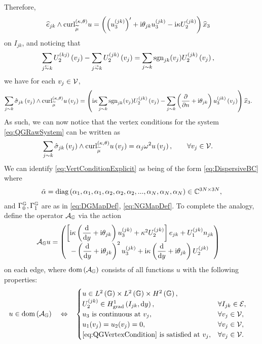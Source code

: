 Therefore, 
\begin{align*}
	\widehat{e}_{jk}\wedge\mathrm{curl}_{\widetilde{\mu}}^{\left( \kappa, \theta \right)}u &= \left(  \left(  u_3^{(jk)}  \right)' + \mathrm{i}\theta_{jk}u_3^{(jk)} - \mathrm{i}\kappa U_2^{(jk)}  \right)\widehat{x}_3
\end{align*}
on $I_{jk}$, and noticing that 
\begin{align*}
	\sum_{j\conRight k} U_2^{(kj)}\bracs{v_j} - \sum_{j\conLeft k} U_2^{(jk)}\bracs{v_j} &=
	\sum_{j\con k} \sgn_{jk}(v_j) U_2^{(jk)}\bracs{v_j},
\end{align*} 
we have for each $v_j\in\mathcal{V}$,
\begin{align*}
	\sum_{j\sim k} \hat{\sigma}_{jk}\left( v_j \right) \wedge \mathrm{curl}_{\widetilde{\mu}}^{\left( \kappa, \theta \right)}u\left( v_j \right)
	&= \left(  
	\mathrm{i}\kappa\sum_{j\sim k} \mathrm{sgn}_{jk}(v_j) U_2^{(jk)}\left( v_j \right)
	- \sum_{j\sim k}\left( \dfrac{\partial }{\partial n} + \mathrm{i}\theta_{jk} \right)u_3^{(jk)}\left( v_j \right)
	 \right) \widehat{x}_3.
\end{align*}
As such, we can now notice that the vertex conditions for the system \eqref{eq:QGRawSystem} can be written as
\begin{align} \label{eq:VertConditionExplicit}
	\sum_{j\sim k} \hat{\sigma}_{jk}\left( v_j \right) \wedge \mathrm{curl}_{\widetilde{\mu}}^{\left( \kappa, \theta \right)}u\left( v_j \right)
	&= \alpha_j\omega^2 u\left( v_j \right),
	\qquad \forall v_j\in\mathcal{V}.
\end{align}
We can identify \eqref{eq:VertConditionExplicit} as being of the form \eqref{eq:DispersiveBC} where
\begin{align*}
	\tilde{\alpha} = 
	\mathrm{diag}\left( \alpha_1, \alpha_1, \alpha_1, \alpha_2, \alpha_2, \alpha_2, ..., \alpha_N, \alpha_N, \alpha_N \right) \in \mathbb{C}^{3N\times 3N},
\end{align*}
and $\Gamma_0^{\mathbb{G}}, \Gamma_1^{\mathbb{G}}$ are as in \eqref{eq:DGMapDef}, \eqref{eq:NGMapDef}.
To complete the analogy, define the operator $\mathcal{A}_{\mathbb{G}}$ via the action
\begin{align*}
	\mathcal{A}_{\mathbb{G}} u &= 
	\begin{pmatrix}
		\left[  \mathrm{i}\kappa\left( \dfrac{\mathrm{d}}{\mathrm{d}y} + \mathrm{i}\theta_{jk}  \right)u_3^{(jk)} + \kappa^2 U_2^{(jk)}  \right]e_{jk}
		+ U_1^{(jk)} n_{jk} \\
		- \left( \dfrac{\mathrm{d}}{\mathrm{d}y} + \mathrm{i}\theta_{jk}  \right)^2 u_3^{(jk)} + \mathrm{i}\kappa \left( \dfrac{\mathrm{d}}{\mathrm{d}y} + \mathrm{i}\theta_{jk}  \right)U_2^{(jk)}
	\end{pmatrix}
\end{align*}
on each edge, where $\mathrm{dom}\left( \mathcal{A}_{\mathbb{G}} \right)$ consists of all functions $u$ with the following properties:
\begin{align*}
	u\in\mathrm{dom}\left( \mathcal{A}_{\mathbb{G}} \right) \quad\Leftrightarrow\quad &
	\begin{cases}
	u\in L^2\left( \mathbb{G} \right)\times L^2\left( \mathbb{G} \right)\times H^2\left( \mathbb{G} \right), \\
	U_2^{(jk)}\in H^1_\mathrm{grad}\left( I_{jk}, \mathrm{d}y \right), & \forall I_{jk}\in\mathcal{E}, \\
	u_3 \text{ is continuous at } v_j, & \forall v_j\in\mathcal{V}, \\
	u_1(v_j) = u_2(v_j) = 0, & \forall v_j\in\mathcal{V}, \\
	\text{\eqref{eq:QGVertexCondition} is satisfied at } v_j, & \forall v_j\in\mathcal{V}.
	\end{cases}
\end{align*}
